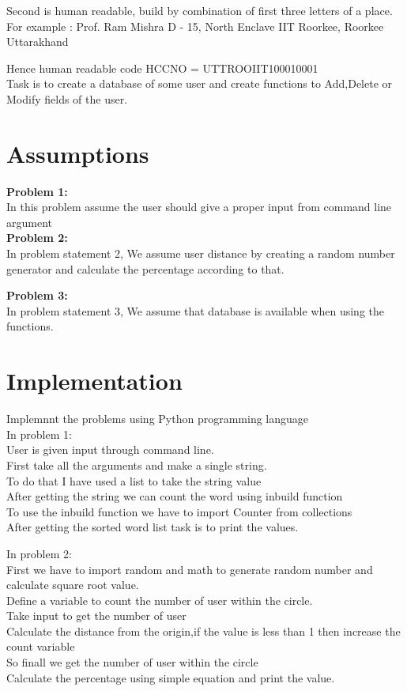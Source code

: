 \documentclass{article}
\begin{document}
Second is human readable, build by combination of first three letters of a place.
For example :
Prof. Ram Mishra
D - 15, North Enclave
IIT Roorkee, Roorkee
Uttarakhand

Hence human readable code HCCNO =  UTTROOIIT100010001\\

Task is to create a database of some user and create functions to Add,Delete or Modify fields of the user.\\


\cleardoublepage

\section{Assumptions}
\textbf{Problem 1:}\\
In this problem assume the user should give a proper input from command line argument\\
\textbf{Problem 2:}\\
In problem statement 2, We assume user distance by creating a random number generator and calculate the percentage according to that.

\textbf{Problem 3:}\\
In problem statement 3, We assume that database is available when using the functions.
\cleardoublepage



\section{Implementation}

Implemnnt the problems using Python programming language\\

In problem 1:\\
User is given input through command line.\\
First take all the arguments and make a single string.\\
To do that I have used a list to take the string value\\
After getting the string we can count the word using inbuild function\\
To use the inbuild function we have to import Counter from collections\\
After getting the sorted word list task is to print the values.\\

\bigskip

In problem 2:\\
First we have to import random and math to generate random number and calculate square root value.\\
Define a variable to count the number of user within the circle.\\
Take input to get the number of user\\
Calculate the distance from the origin,if the value is less than 1 then increase the count variable\\
So finall we get the number of user within the circle\\
Calculate the percentage using simple equation and print the value.\\
\bigskip
\end{document}
